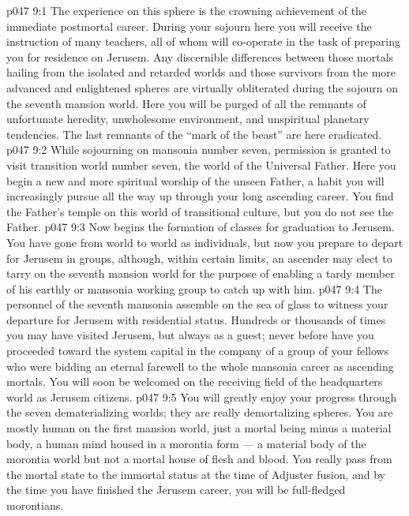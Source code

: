 \vs p047 9:1 The experience on this sphere is the crowning achievement of the immediate postmortal career. During your sojourn here you will receive the instruction of many teachers, all of whom will co\hyp{}operate in the task of preparing you for residence on Jerusem. Any discernible differences between those mortals hailing from the isolated and retarded worlds and those survivors from the more advanced and enlightened spheres are virtually obliterated during the sojourn on the seventh mansion world. Here you will be purged of all the remnants of unfortunate heredity, unwholesome environment, and unspiritual planetary tendencies. The last remnants of the “mark of the beast” are here eradicated.
\vs p047 9:2 While sojourning on mansonia number seven, permission is granted to visit transition world number seven, the world of the Universal Father. Here you begin a new and more spiritual worship of the unseen Father, a habit you will increasingly pursue all the way up through your long ascending career. You find the Father’s temple on this world of transitional culture, but you do not see the Father.
\vs p047 9:3 \pc Now begins the formation of classes for graduation to Jerusem. You have gone from world to world as individuals, but now you prepare to depart for Jerusem in groups, although, within certain limits, an ascender may elect to tarry on the seventh mansion world for the purpose of enabling a tardy member of his earthly or mansonia working group to catch up with him.
\vs p047 9:4 The personnel of the seventh mansonia assemble on the sea of glass to witness your departure for Jerusem with residential status. Hundreds or thousands of times you may have visited Jerusem, but always as a guest; never before have you proceeded toward the system capital in the company of a group of your fellows who were bidding an eternal farewell to the whole mansonia career as ascending mortals. You will soon be welcomed on the receiving field of the headquarters world as Jerusem citizens.
\vs p047 9:5 \pc You will greatly enjoy your progress through the seven dematerializing worlds; they are really demortalizing spheres. You are mostly human on the first mansion world, just a mortal being minus a material body, a human mind housed in a morontia form --- a material body of the morontia world but not a mortal house of flesh and blood. You really pass from the mortal state to the immortal status at the time of Adjuster fusion, and by the time you have finished the Jerusem career, you will be full\hyp{}fledged morontians.
